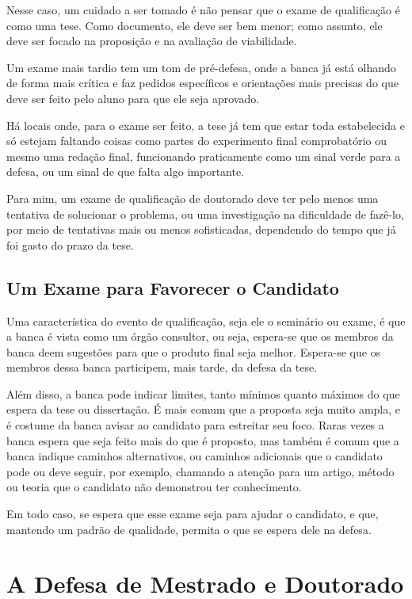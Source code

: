 Nesse caso, um cuidado a ser tomado é não pensar que o exame de qualificação é como uma tese. Como documento, ele deve ser bem menor; como assunto, ele deve ser focado na proposição e na avaliação de viabilidade. 

Um exame mais tardio tem um tom de pré-defesa, onde a banca já está olhando de forma mais crítica e faz pedidos específicos e orientações mais precisas do que deve ser feito pelo aluno para que ele seja aprovado.

Há locais onde, para o exame ser feito, a tese já tem que estar toda estabelecida e só estejam faltando coisas como partes do experimento final comprobatório ou mesmo uma redação final, funcionando praticamente como um sinal verde para a defesa, ou um sinal de que falta algo importante. 

Para mim, um exame de qualificação de doutorado deve ter pelo menos uma tentativa de solucionar o problema, ou uma investigação na dificuldade de fazê-lo, por meio de tentativas mais ou menos sofisticadas, dependendo do tempo que já foi gasto do prazo da tese.

\subsection{Um Exame para Favorecer o Candidato}

Uma característica do evento de qualificação, seja ele o seminário ou exame, é que a banca é vista como um órgão consultor, ou seja, espera-se que os membros da banca deem sugestões para que o produto final seja melhor. Espera-se que os membros dessa banca participem, mais tarde, da defesa da tese.

Além disso, a banca pode indicar limites, tanto mínimos quanto máximos do que espera da tese ou dissertação. É mais comum que a proposta seja muito ampla, e é costume da banca avisar ao candidato para estreitar seu foco. Raras vezes a banca espera que seja feito mais do que é proposto, mas também é comum que a banca indique caminhos alternativos, ou caminhos adicionais que o candidato pode ou deve seguir, por exemplo, chamando a atenção para um artigo, método ou teoria que o candidato não demonstrou ter conhecimento.

Em todo caso, se espera que esse exame seja para ajudar o candidato, e que, mantendo um padrão de qualidade, permita o que se espera dele na defesa.

\section{A Defesa de Mestrado e Doutorado}

